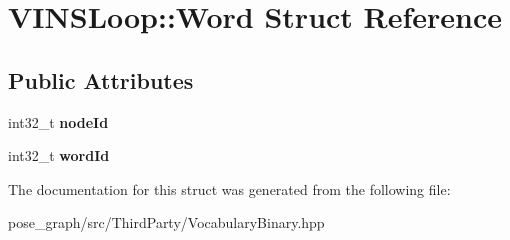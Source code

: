 \hypertarget{structVINSLoop_1_1Word}{}\section{V\+I\+N\+S\+Loop\+:\+:Word Struct Reference}
\label{structVINSLoop_1_1Word}
\subsection*{Public Attributes}
\begin{DoxyCompactItemize}
\item 
\mbox{\label{structVINSLoop_1_1Word_aa0983cc3ce750770e145a5a76ab7ddd2}} 
int32\+\_\+t {\bfseries node\+Id}
\item 
\mbox{\label{structVINSLoop_1_1Word_abb4bd836575983eb1a53734d751115e4}} 
int32\+\_\+t {\bfseries word\+Id}
\end{DoxyCompactItemize}


The documentation for this struct was generated from the following file\+:\begin{DoxyCompactItemize}
\item 
pose\+\_\+graph/src/\+Third\+Party/Vocabulary\+Binary.\+hpp\end{DoxyCompactItemize}
